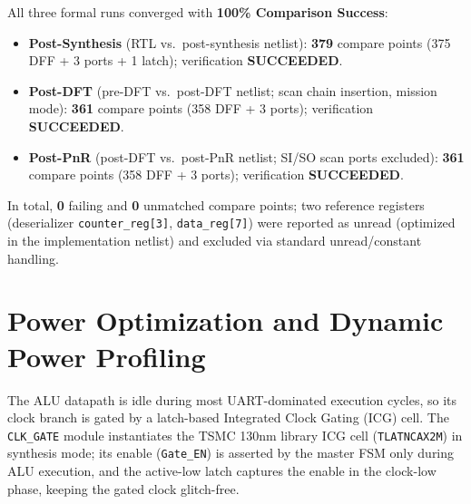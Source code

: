 \documentclass[11pt,a4paper]{article}
\begin{document}
All three formal runs converged with \textbf{100\% Comparison Success}:
\begin{itemize}
    \item \textbf{Post-Synthesis} (RTL vs.\ post-synthesis netlist): \textbf{379} compare points (375 DFF + 3 ports + 1 latch); verification \textbf{SUCCEEDED}.
    \item \textbf{Post-DFT} (pre-DFT vs.\ post-DFT netlist; scan chain insertion, mission mode): \textbf{361} compare points (358 DFF + 3 ports); verification \textbf{SUCCEEDED}.
    \item \textbf{Post-PnR} (post-DFT vs.\ post-PnR netlist; SI/SO scan ports excluded): \textbf{361} compare points (358 DFF + 3 ports); verification \textbf{SUCCEEDED}.
\end{itemize}

In total, \textbf{0} failing and \textbf{0} unmatched compare points; two reference registers (deserializer \texttt{counter\_reg[3]}, \texttt{data\_reg[7]}) were reported as unread (optimized in the implementation netlist) and excluded via standard unread/constant handling.

\section{Power Optimization and Dynamic Power Profiling}
\label{sec:power}

The ALU datapath is idle during most UART-dominated execution cycles, so its clock branch is gated by a latch-based Integrated Clock Gating (ICG) cell. The \texttt{CLK\_GATE} module instantiates the TSMC 130nm library ICG cell (\texttt{TLATNCAX2M}) in synthesis mode; its enable (\texttt{Gate\_EN}) is asserted by the master FSM only during ALU execution, and the active-low latch captures the enable in the clock-low phase, keeping the gated clock glitch-free.
\end{document}
